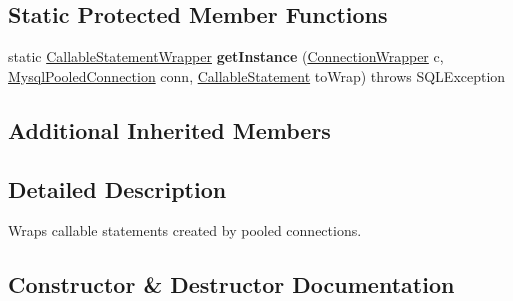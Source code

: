 \subsection*{Static Protected Member Functions}
\begin{DoxyCompactItemize}
\item 
\mbox{\label{classcom_1_1mysql_1_1cj_1_1jdbc_1_1_callable_statement_wrapper_a7694068936a8af45dd84485c25548659}} 
static \mbox{\hyperlink{classcom_1_1mysql_1_1cj_1_1jdbc_1_1_callable_statement_wrapper}{Callable\+Statement\+Wrapper}} {\bfseries get\+Instance} (\mbox{\hyperlink{classcom_1_1mysql_1_1cj_1_1jdbc_1_1_connection_wrapper}{Connection\+Wrapper}} c, \mbox{\hyperlink{classcom_1_1mysql_1_1cj_1_1jdbc_1_1_mysql_pooled_connection}{Mysql\+Pooled\+Connection}} conn, \mbox{\hyperlink{classcom_1_1mysql_1_1cj_1_1jdbc_1_1_callable_statement}{Callable\+Statement}} to\+Wrap)  throws S\+Q\+L\+Exception 
\end{DoxyCompactItemize}
\subsection*{Additional Inherited Members}


\subsection{Detailed Description}
Wraps callable statements created by pooled connections. 

\subsection{Constructor \& Destructor Documentation}
\mbox{\label{classcom_1_1mysql_1_1cj_1_1jdbc_1_1_callable_statement_wrapper_a60a04ffa9e3517620a85c8c64169050f}} 
